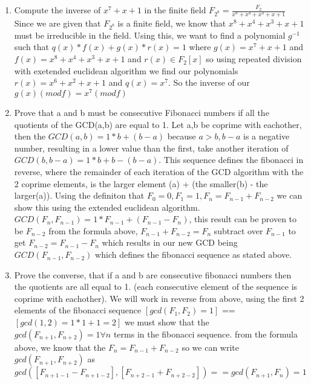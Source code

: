 \documentclass[12pt]{article}
\begin{document}
\begin{enumerate}
  \item Compute the inverse of $ x^7 + x + 1 $ in the finite field $ F_{2^8} = \frac{F_2}{x^8 + x^4 + x^3 + x + 1}$ 
    Since we are given that $F_{2^8} $ is a finite field, we know that $ x^8 + x^4 + x^3 + x + 1$ must be irreducible in the field.  Using this, we want to find a polynomial $g^{-1}$ such that $q(x)*f(x) +g(x)*r(x) = 1$ where $g(x) = x^7+x+1$ and $f(x) = x^8+x^4+x^3+x+1$ and $r(x) \in F_{2}[x]$ so using repeated division with exetended euclidean algorithm we find our polynomials $r(x) = x^6+x^2+x+1$ and $q(x)=x^7$.  So the inverse of our $g(x) (mod f) = x^7 (mod f)$

  \item Prove that a and b must be consecutive Fibonacci numbers if all the quotients of the GCD(a,b) are equal to 1.
    Let a,b be coprime with eachother, then the $ GCD(a,b) = 1 * b + (b-a) $ because $a>b, b-a$ is a negative number, resulting in a lower value than the first, take another iteration of $ GCD(b, b-a) = 1*b + b - (b - a) $.  This sequence defines the fibonacci in reverse, where the remainder of each iteration of the GCD algorithm with the 2 coprime elements, is the larger element (a) + (the smaller(b) - the larger(a)).  Using the definiton that $ F_0 = 0, F_1 = 1, F_n = F_{n-1} + F_{n-2} $ we can show this using the extended euclidean algorithm. $GCD(F_n, F_{n-1}) = 1 * F_{n-1} + (F_{n-1} - F_{n}) $, this result can be proven to be $ F_{n-2} $ from the formula above, $ F_{n-1} + F_{n-2} = F_n $ subtract over $ F_{n-1} $ to get $ F_{n-2} = F_{n-1} - F_{n} $ which results in our new GCD being $ GCD(F_{n-1}, F_{n-2}) $ which defines the fibonacci sequence as stated above.

  \item Prove the converse, that if a and b are consecutive fibonacci numbers then the quotients are all equal to 1. (each consecutive element of the sequence is coprime with eachother).
    We will work in reverse from above, using the first 2 elements of the fibonacci sequence $[ gcd(F_1, F_2) = 1 ]$ == $[ gcd(1, 2) = 1*1 + 1 = 2 ] $ we must show that the $gcd(F_{n+1}, F_{n+2}) = 1 \forall n $ terms in the fibonacci sequence.   from the formula above, we know that the $ F_n = F_{n - 1} + F_{n-2} $ so we can write $ gcd(F_{n+1}, F_{n+2})$ as $gcd([F_{n+1-1} - F_{n+1-2}], [F_{n+2-1} + F_{n+2-2}]) == gcd(F_{n+1}, F_{n}) = 1 $




\end{enumerate}
\end{document}
